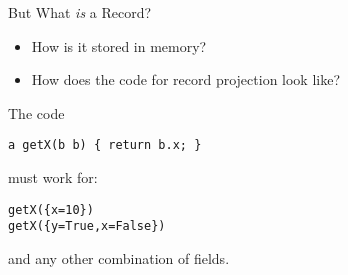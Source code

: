 \documentclass{beamer}
\begin{document}
\begin{frame}[fragile]{But What \emph{is} a Record?}

\onslide<+->

\begin{itemize}
  \item How is it stored in memory?
  \item How does the code for record projection look like?
\end{itemize}

\onslide<+->

The code

\begin{verbatim}
a getX(b b) { return b.x; }
\end{verbatim}

must work for:

\begin{verbatim}
getX({x=10})
getX({y=True,x=False})
\end{verbatim}

and any other combination of fields.

\end{frame}
\end{document}
